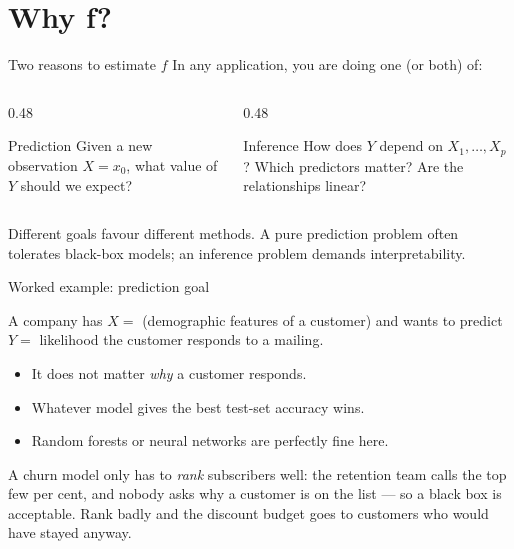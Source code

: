\documentclass[aspectratio=169,11pt]{beamer}
\begin{document}
\section{Why f?}

\begin{frame}{Two reasons to estimate $f$}
  In any application, you are doing one (or both) of:
  \begin{columns}[T]
    \begin{column}{0.48\textwidth}
      \begin{block}{Prediction}
        Given a new observation $X = x_0$, what value of $Y$ should we
        expect?
      \end{block}
    \end{column}
    \begin{column}{0.48\textwidth}
      \begin{block}{Inference}
        How does $Y$ depend on $X_1, \ldots, X_p$? Which predictors
        matter? Are the relationships linear?
      \end{block}
    \end{column}
  \end{columns}
  \begin{takeaway}
    Different goals favour different methods. A pure prediction
    problem often tolerates black-box models; an inference problem
    demands interpretability.
  \end{takeaway}
\end{frame}

\begin{frame}{Worked example: prediction goal}
  \begin{numexample}
    A company has $X = $ (demographic features of a customer) and
    wants to predict $Y = $ likelihood the customer responds to a
    mailing.
    \begin{itemize}
      \item It does not matter \emph{why} a customer responds.
      \item Whatever model gives the best test-set accuracy wins.
      \item Random forests or neural networks are perfectly fine here.
    \end{itemize}
  \end{numexample}
  \begin{industry}
    A churn model only has to \emph{rank} subscribers well: the retention team calls the top
    few per cent, and nobody asks why a customer is on the list --- so a black box is
    acceptable. Rank badly and the discount budget goes to customers who would have stayed
    anyway.
  \end{industry}
\end{frame}
\end{document}
